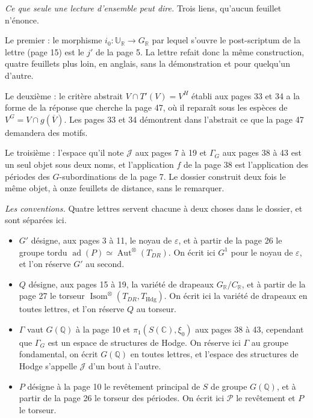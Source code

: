 \documentclass[11pt,a4paper]{article}
\begin{document}
\emph{Ce que seule une lecture d'ensemble peut dire.} Trois liens, qu'aucun
feuillet n'énonce.

Le premier : le morphisme $i_{0} : \mathbb{U}_{\mathbb{R}} \to G_{\mathbb{R}}$
par lequel s'ouvre le post-scriptum de la lettre (page 15) est le
$j'$ de la page 5. La lettre refait donc la même construction, quatre feuillets
plus loin, en anglais, sans la démonstration et pour quelqu'un d'autre.

Le deuxième : le critère abstrait $V \cap T'(V) = V^{H}$ établi aux pages 33 et
34 a la forme de la réponse que cherche la page 47, où il reparaît sous
les espèces de $V^{G} = V \cap g(\overline{V})$. Les pages 33 et 34 démontrent
dans l'abstrait ce que la page 47 demandera des motifs.

Le troisième : l'espace qu'il note $\mathcal{J}$ aux pages 7 à 19 et
$\Gamma_{G}$ aux pages 38 à 43 est un seul objet sous deux noms, et
l'application $f$ de la page 38 est l'application des périodes des
$G$-subordinations de la page 7. Le dossier construit deux fois le même objet, à
onze feuillets de distance, sans le remarquer.

\emph{Les conventions.} Quatre lettres servent chacune à deux choses dans le
dossier, et sont séparées ici.

\begin{itemize}
  \item $G'$ désigne, aux pages 3 à 11, le noyau de $\varepsilon$, et à partir
  de la page 26 le groupe tordu $\operatorname{ad}(P) \simeq
  \operatorname{Aut}^{\otimes}(T_{DR})$. On écrit ici $G^{1}$ pour le noyau de
  $\varepsilon$, et l'on réserve $G'$ au second.
  \item $Q$ désigne, aux pages 15 à 19, la variété de drapeaux
  $G_{\mathbb{R}}/C_{\mathbb{R}}$, et à partir de la page 27 le torseur
  $\operatorname{Isom}^{\otimes}(T_{DR}, T_{\mathrm{Hdg}})$. On écrit ici la
  variété de drapeaux en toutes lettres, et l'on réserve $Q$ au torseur.
  \item $\Gamma$ vaut $G(\mathbb{Q})$ à la page 10 et
  $\pi_{1}(S(\mathbb{C}), \xi_{0})$ aux pages 38 à 43, cependant que
  $\Gamma_{G}$ est un espace de structures de Hodge. On réserve ici $\Gamma$ au
  groupe fondamental, on écrit $G(\mathbb{Q})$ en toutes lettres, et l'espace
  des structures de Hodge s'appelle $\mathcal{J}$ d'un bout à l'autre.
  \item $P$ désigne à la page 10 le revêtement principal de $S$ de groupe
  $G(\mathbb{Q})$, et à partir de la page 26 le torseur des périodes. On écrit
  ici $\mathcal{P}$ le revêtement et $P$ le torseur.
\end{itemize}
\end{document}
